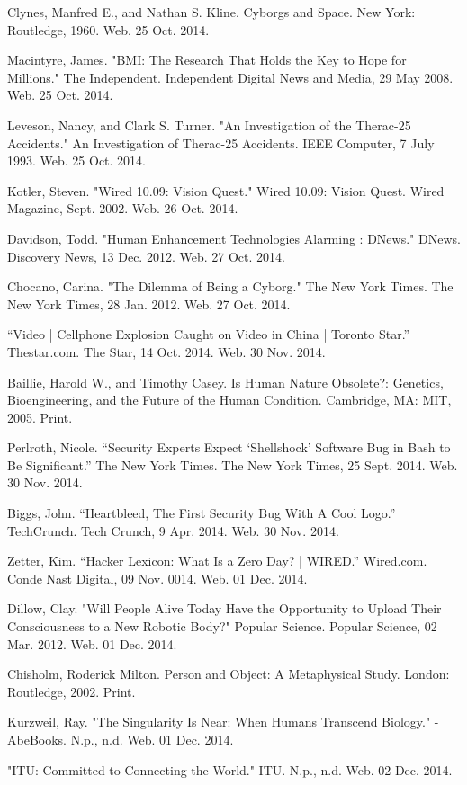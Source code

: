 \documentclass[12pt,a4paper,notitlepage]{article}
\begin{document}
\newpage
\begin{thebibliography}{9}

 Clynes, Manfred E., and Nathan S. Kline. Cyborgs and Space. New
	York: Routledge, 1960. Web. 25 Oct. 2014.

 Macintyre, James. "BMI: The Research That Holds the Key to
	Hope for Millions." The Independent. Independent Digital News and Media, 29
	May 2008. Web. 25 Oct. 2014.

 Leveson, Nancy, and Clark S. Turner. "An Investigation of the
	Therac-25 Accidents." An Investigation of Therac-25 Accidents. IEEE
	Computer, 7 July 1993. Web. 25 Oct. 2014.

 Kotler, Steven. "Wired 10.09: Vision Quest." Wired 10.09: Vision
	Quest. Wired Magazine, Sept. 2002. Web. 26 Oct. 2014.

 Davidson, Todd. "Human Enhancement Technologies Alarming :
	DNews." DNews. Discovery News, 13 Dec. 2012. Web. 27 Oct. 2014.

 Chocano, Carina. "The Dilemma of Being a Cyborg." The New York
	Times. The New York Times, 28 Jan. 2012. Web. 27 Oct. 2014.

 ``Video | Cellphone Explosion Caught on Video in
	China | Toronto Star.'' Thestar.com. The Star, 14 Oct. 2014. Web. 30 Nov.
	2014.

 Baillie, Harold W., and Timothy Casey. Is Human Nature
	Obsolete?: Genetics, Bioengineering, and the Future of the Human Condition.
	Cambridge, MA: MIT, 2005. Print.

 Perlroth, Nicole. ``Security Experts Expect ‘Shellshock’
	Software Bug in Bash to Be Significant.'' The New York Times. The New York
	Times, 25 Sept. 2014. Web. 30 Nov. 2014.

 Biggs, John. ``Heartbleed, The First Security Bug With A
	Cool Logo.'' TechCrunch. Tech Crunch, 9 Apr. 2014. Web. 30 Nov. 2014.

Zetter, Kim. ``Hacker Lexicon: What Is a Zero Day? | WIRED.''
	Wired.com. Conde Nast Digital, 09 Nov. 0014. Web. 01 Dec. 2014.

Dillow, Clay. "Will People Alive Today Have the Opportunity to
	Upload Their Consciousness to a New Robotic Body?" Popular Science. Popular
	Science, 02 Mar. 2012. Web. 01 Dec. 2014.

Chisholm, Roderick Milton. Person and Object: A Metaphysical
	Study. London: Routledge, 2002. Print.

Kurzweil, Ray. "The Singularity Is Near: When Humans Transcend
	Biology." - AbeBooks. N.p., n.d. Web. 01 Dec. 2014.

"ITU: Committed to Connecting the World." ITU. N.p., n.d. Web. 02
	Dec. 2014.

\end{thebibliography}
\end{document}
